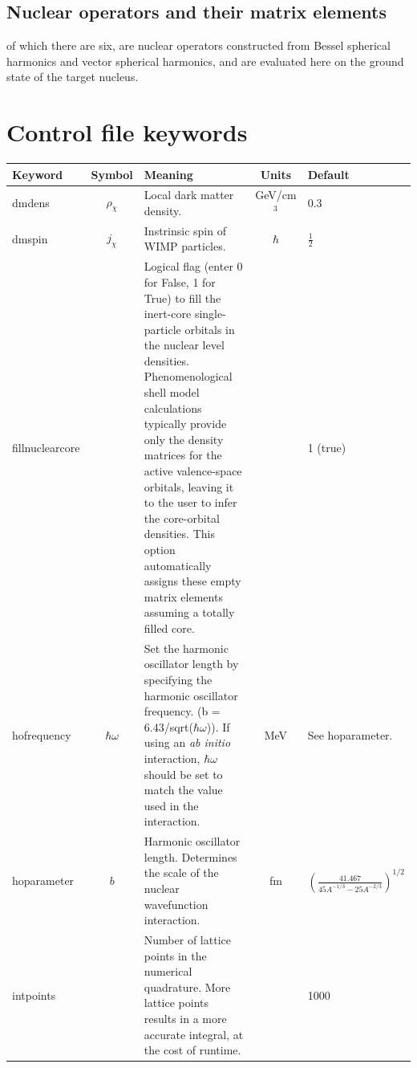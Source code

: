 \documentclass[11pt]{article}
\begin{document}
\subsection{Nuclear operators and their matrix elements}
of which there are six, are nuclear operators constructed from Bessel 
spherical harmonics and vector spherical harmonics, and are evaluated here on 
the ground state of the target nucleus.

\section{Control file keywords}

\begin{longtable}{| l | c | p{2.5in} | c | l | }
  \hline Keyword & Symbol & Meaning & Units & Default \\

  \hline dmdens & $\rho_\chi$ & Local dark matter density. & GeV/cm$^3$ & 0.3\\

  \hline dmspin & $j_\chi$ & Instrinsic spin of WIMP particles. & $\hbar$ &
  $\frac{1}{2}$ \\

  \hline fillnuclearcore & & Logical flag (enter 0 for False, 1 for True) to fill the
  inert-core single-particle orbitals in the nuclear level densities.
  Phenomenological shell model calculations typically provide only the density
  matrices for the active valence-space orbitals, leaving it to the user to
  infer the core-orbital densities. This option automatically assigns these
  empty matrix elements assuming a totally filled core. & & 1 (true)\\

  \hline hofrequency & $\hbar \omega$ & Set the harmonic oscillator length by
  specifying the harmonic oscillator frequency. (b = 6.43/sqrt($\hbar\omega$)).
  If using an \textit{ab initio} interaction, $\hbar \omega$ should be set to
  match the value used in the interaction.
              & MeV & See hoparameter.\\

  \hline hoparameter & $b$ & Harmonic oscillator length. Determines the scale of the
  nuclear wavefunction interaction. & fm &
  $(\frac{41.467}{45A^{-1/3}-25A^{-2/3}})^{1/2}$  \\

  \hline intpoints & & Number of lattice points in the numerical quadrature. More lattice
  points results in a more accurate integral, at the cost of runtime. & &
  1000\\


\end{longtable}
\end{document}
